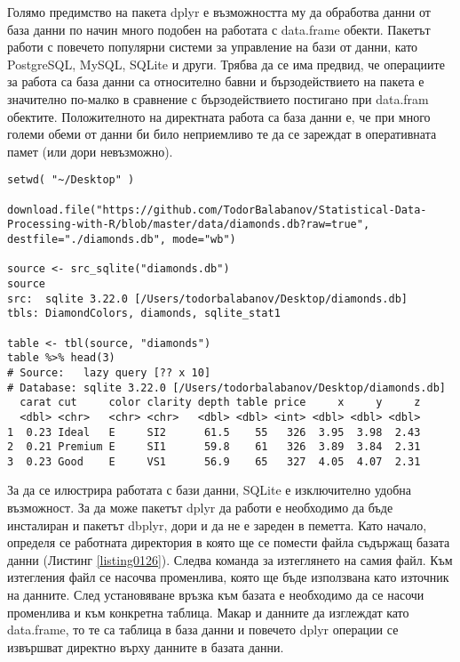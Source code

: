 Голямо предимство на пакета dplyr е възможността му да обработва данни от база данни по начин много подобен на работата с data.frame обекти. Пакетът работи с повечето популярни системи за управление на бази от данни, като PostgreSQL, MySQL, SQLite и други. Трябва да се има предвид, че операциите за работа са база данни са относително бавни и бързодействието на пакета е значително по-малко в сравнение с бързодействието постигано при data.fram обектите. Положителното на директната работа са база данни е, че при много големи обеми от данни би било неприемливо те да се зареждат в оперативната памет (или дори невъзможно). 

\begin{lstlisting}[caption=Работа с база данни, label=listing0126]
setwd( "~/Desktop" )

download.file("https://github.com/TodorBalabanov/Statistical-Data-Processing-with-R/blob/master/data/diamonds.db?raw=true", destfile="./diamonds.db", mode="wb")

source <- src_sqlite("diamonds.db")
source
src:  sqlite 3.22.0 [/Users/todorbalabanov/Desktop/diamonds.db]
tbls: DiamondColors, diamonds, sqlite_stat1

table <- tbl(source, "diamonds")
table %>% head(3)
# Source:   lazy query [?? x 10]
# Database: sqlite 3.22.0 [/Users/todorbalabanov/Desktop/diamonds.db]
  carat cut     color clarity depth table price     x     y     z
  <dbl> <chr>   <chr> <chr>   <dbl> <dbl> <int> <dbl> <dbl> <dbl>
1  0.23 Ideal   E     SI2      61.5    55   326  3.95  3.98  2.43
2  0.21 Premium E     SI1      59.8    61   326  3.89  3.84  2.31
3  0.23 Good    E     VS1      56.9    65   327  4.05  4.07  2.31
\end{lstlisting}

За да се илюстрира работата с бази данни, SQLite е изключително удобна възможност. За да може пакетът dplyr да работи е необходимо да бъде инсталиран и пакетът dbplyr, дори и да не е зареден в пеметта. Като начало, определя се работната директория в която ще се помести файла съдържащ базата данни (Листинг \ref{listing0126}). Следва команда за изтеглянето на самия файл. Към изтегления файл се насочва променлива, която ще бъде използвана като източник на данните. След установяване връзка към базата е необходимо да се насочи променлива и към конкретна таблица. Макар и данните да изглеждат като data.frame, то те са таблица в база данни и повечето dplyr операции се извършват директно върху данните в базата данни.

